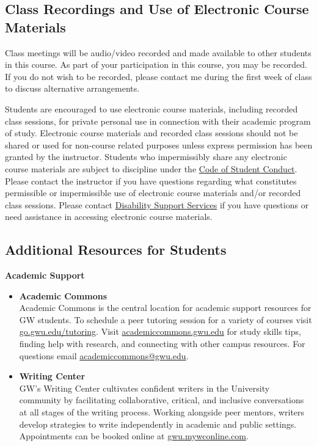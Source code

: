 \documentclass[12pt,letterpaper]{article}
\begin{document}
\subsection*{Class Recordings and Use of Electronic Course Materials}

Class meetings will be audio/video recorded and made available to other students in this course. As part of your participation in this course, you may be recorded. If you do not wish to be recorded, please contact me during the first week of class to discuss alternative arrangements. \par

Students are encouraged to use electronic course materials, including recorded class sessions, for private personal use in connection with their academic program of study. Electronic course materials and recorded class sessions should not be shared or used for non-course related purposes unless express permission has been granted by the instructor. Students who impermissibly share any electronic course materials are subject to discipline under the \href{https://studentconduct.gwu.edu/code-student-conduct}{Code of Student Conduct}. Please contact the instructor if you have questions regarding what constitutes permissible or impermissible use of electronic course materials and/or recorded class sessions. Please contact \href{https://disabilitysupport.gwu.edu/}{Disability Support Services} if you have questions or need assistance in accessing electronic course materials.

\subsection*{Additional Resources for Students}

\textbf{Academic Support}

\begin{itemize}
    \item \textbf{Academic Commons} \\
    Academic Commons is the central location for academic support resources for GW students. To schedule a peer tutoring session for a variety of courses visit \href{https://go.gwu.edu/tutoring}{go.gwu.edu/tutoring}. Visit \href{https://academiccommons.gwu.edu}{academiccommons.gwu.edu} for study skills tips, finding help with research, and connecting with other campus resources. For questions email \href{mailto:academiccommons@gwu.edu}{academiccommons@gwu.edu}.
    \item \textbf{Writing Center} \\
    GW’s Writing Center cultivates confident writers in the University community by facilitating collaborative, critical, and inclusive conversations at all stages of the writing process. Working alongside peer mentors, writers develop strategies to write independently in academic and public settings. Appointments can be booked online at \href{https://gwu.mywconline.com}{gwu.mywconline.com}.
\end{itemize}
\end{document}
